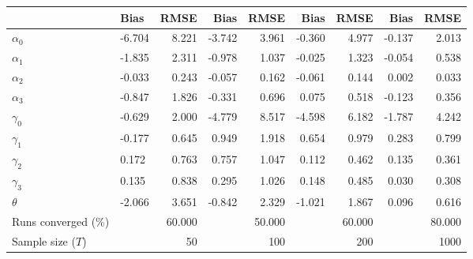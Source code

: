
\begin{tabular}[t]{llrrrrrrr}
\toprule
  & Bias & RMSE & Bias & RMSE & Bias & RMSE & Bias & RMSE\\
\midrule
$\alpha_{0}$ & -6.704 & 8.221 & -3.742 & 3.961 & -0.360 & 4.977 & -0.137 & 2.013\\
$\alpha_{1}$ & -1.835 & 2.311 & -0.978 & 1.037 & -0.025 & 1.323 & -0.054 & 0.538\\
$\alpha_{2}$ & -0.033 & 0.243 & -0.057 & 0.162 & -0.061 & 0.144 & 0.002 & 0.033\\
$\alpha_{3}$ & -0.847 & 1.826 & -0.331 & 0.696 & 0.075 & 0.518 & -0.123 & 0.356\\
$\gamma_{0}$ & -0.629 & 2.000 & -4.779 & 8.517 & -4.598 & 6.182 & -1.787 & 4.242\\
$\gamma_{1}$ & -0.177 & 0.645 & 0.949 & 1.918 & 0.654 & 0.979 & 0.283 & 0.799\\
$\gamma_{2}$ & 0.172 & 0.763 & 0.757 & 1.047 & 0.112 & 0.462 & 0.135 & 0.361\\
$\gamma_{3}$ & 0.135 & 0.838 & 0.295 & 1.026 & 0.148 & 0.485 & 0.030 & 0.308\\
$\theta$ & -2.066 & 3.651 & -0.842 & 2.329 & -1.021 & 1.867 & 0.096 & 0.616\\
Runs converged (\%) &  & 60.000 &  & 50.000 &  & 60.000 &  & 80.000\\
Sample size ($T$) &  & 50 &  & 100 &  & 200 &  & 1000\\
\bottomrule
\end{tabular}
